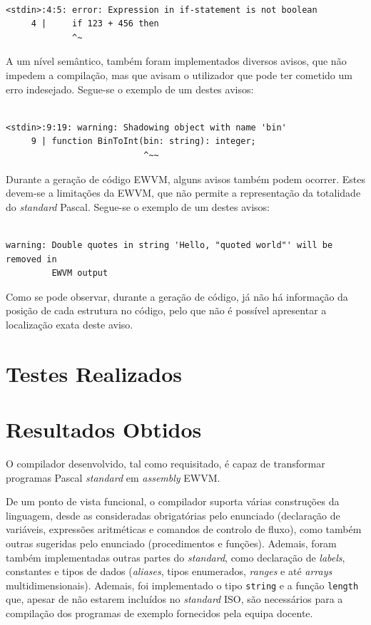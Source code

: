 \documentclass[12pt, a4paper]{article}
\begin{document}
\begin{lstlisting}

<stdin>:4:5: error: Expression in if-statement is not boolean
     4 |     if 123 + 456 then
             ^~
\end{lstlisting}

A um nível semântico, também foram implementados diversos avisos, que não impedem a compilação, mas
que avisam o utilizador que pode ter cometido um erro indesejado. Segue-se o exemplo de um destes
avisos:


\begin{lstlisting}

<stdin>:9:19: warning: Shadowing object with name 'bin'
     9 | function BinToInt(bin: string): integer;
                           ^~~
\end{lstlisting}

Durante a geração de código EWVM, alguns avisos também podem ocorrer. Estes devem-se a limitações da
EWVM, que não permite a representação da totalidade do \emph{standard} Pascal. Segue-se o exemplo de
um destes avisos:

\begin{lstlisting}

warning: Double quotes in string 'Hello, "quoted world"' will be removed in
         EWVM output
\end{lstlisting}

Como se pode observar, durante a geração de código, já não há informação da posição de cada
estrutura no código, pelo que não é possível apresentar a localização exata deste aviso.

\section{Testes Realizados}

\section{Resultados Obtidos}

O compilador desenvolvido, tal como requisitado, é capaz de transformar programas Pascal
\emph{standard} em \emph{assembly} EWVM.

De um ponto de vista funcional, o compilador suporta várias construções da linguagem, desde as
consideradas obrigatórias pelo enunciado (declaração de variáveis, expressões aritméticas e comandos
de controlo de fluxo), como também outras sugeridas pelo enunciado (procedimentos e funções).
Ademais, foram também implementadas outras partes do \emph{standard}, como declaração de
\emph{labels}, constantes e tipos de dados (\emph{aliases}, tipos enumerados, \emph{ranges} e até
\emph{arrays} multidimensionais). Ademais, foi implementado o tipo \texttt{string} e a função
\texttt{length} que, apesar de não estarem incluídos no \emph{standard} ISO, são necessários para a
compilação dos programas de exemplo fornecidos pela equipa docente.
\end{document}
